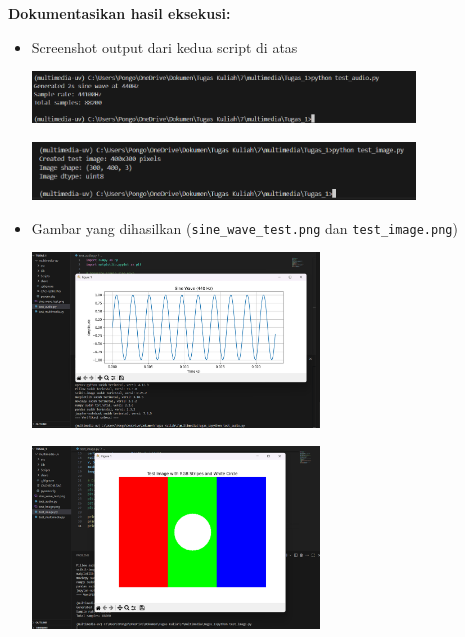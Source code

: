 \documentclass[11pt,a4paper]{article}
\begin{document}
\textbf{Dokumentasikan hasil eksekusi:}
\begin{itemize}
    \item Screenshot output dari kedua script di atas
    
    \begin{minipage}{\linewidth}
        \centering
        \includegraphics[width=0.8\textwidth]{Figure/output audio.png}
        \label{fig:output_script1}
    \end{minipage}

    \begin{minipage}{\linewidth}
        \centering
        \includegraphics[width=0.8\textwidth]{Figure/output image.png}
        \label{fig:output_script2}
    \end{minipage}

    \item Gambar yang dihasilkan (\texttt{sine\_wave\_test.png} dan \texttt{test\_image.png})

    \begin{minipage}{\linewidth}
        \centering
        \includegraphics[width=0.6\textwidth]{Figure/gambar audio.png}
        \label{fig:sine_wave}
    \end{minipage}

    \begin{minipage}{\linewidth}
        \centering
        \includegraphics[width=0.6\textwidth]{Figure/gambar image.png}
        \label{fig:test_image}
    \end{minipage}


\end{itemize}
\end{document}
